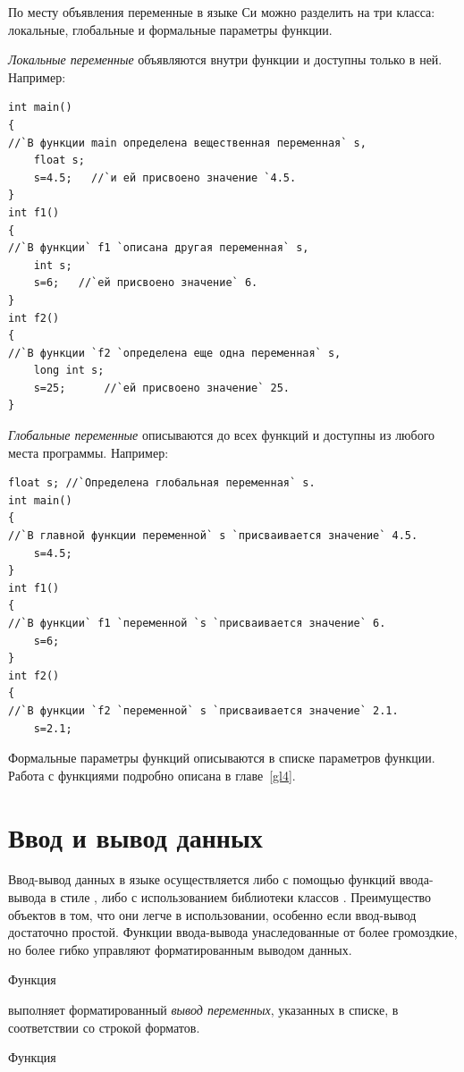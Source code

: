 По месту объявления переменные в языке Си можно разделить на три класса: локальные, глобальные и формальные параметры
функции.

\emph{Локальные переменные} объявляются внутри функции и доступны только в ней.
Например:
\begin{lstlisting}
int main()
{
//`В функции main определена вещественная переменная` s,
    float s; 
    s=4.5;   //`и ей присвоено значение `4.5.
}
int f1()
{
//`В функции` f1 `описана другая переменная` s,
    int s; 
    s=6;   //`ей присвоено значение` 6.
}
int f2()
{
//`В функции `f2 `определена еще одна переменная` s,
	long int s; 
	s=25;      //`ей присвоено значение` 25.
}
\end{lstlisting}

\emph{Глобальные переменные} описываются до всех функций и доступны из любого
места программы. Например:
\begin{lstlisting}
float s; //`Определена глобальная переменная` s.
int main()
{
//`В главной функции переменной` s `присваивается значение` 4.5.
	s=4.5; 
}
int f1()
{
//`В функции` f1 `переменной `s `присваивается значение` 6.
	s=6;
}
int f2()
{
//`В функции `f2 `переменной` s `присваивается значение` 2.1.
    s=2.1;
\end{lstlisting}

Формальные параметры функций описываются в списке параметров функции. Работа с функциями подробно описана в главе~\ref{gl4}.

\section[Ввод и вывод данных]{Ввод и вывод данных}
{Ввод-вывод данных} в языке  осуществляется либо с помощью функций ввода-вывода в стиле , либо с
использованием библиотеки классов . Преимущество объектов  в том, что они легче 
в использовании, особенно если
ввод-вывод достаточно простой. Функции ввода-вывода унаследованные от  более громоздкие, 
но более гибко управляют
форматированным выводом данных.

Функция


выполняет форматированный \emph{вывод переменных}, указанных в списке, в
соответствии со строкой форматов. 

Функция


